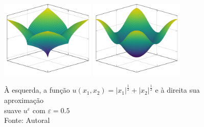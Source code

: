 \documentclass[a4paper, 11pt]{book}
\theoremstyle{definition}
\begin{document}
\begin{ex}
    \begin{figure}
        \centering
        \includegraphics[width=0.4\textwidth]{u.pdf}
        \hspace{10mm}
        \includegraphics[width=0.4\textwidth]{uε.pdf}
        \caption{À esquerda, a função $u(x_1,x_2) = |x_1|^{\frac{1}{2}} + |x_2|^{\frac{1}{2}}$ e à direita sua aproximação\\suave $u^\varepsilon$ com $\varepsilon = 0.5$\\Fonte: Autoral}
        \label{fig:aproximacao-suave-R2}
    \end{figure}
\end{ex}
\end{document}

